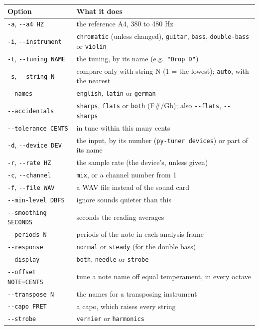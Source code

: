 \documentclass[12pt,
              article,
              oneside
              ]{memoir}
\begin{document}
\begin{longtable}{@{}lp{}@{}}
\toprule
Option & What it does\\
\midrule
\endhead
\texttt{-a}, \texttt{-{}-a4 HZ} & the reference A4, 380 to 480 Hz\\
\texttt{-i}, \texttt{-{}-instrument} & \texttt{chromatic} (unless changed), \texttt{guitar}, \texttt{bass}, \texttt{double-bass} or \texttt{violin}\\
\texttt{-t}, \texttt{-{}-tuning NAME} & the tuning, by its name (e.g.\ \texttt{"Drop D"})\\
\texttt{-s}, \texttt{-{}-string N} & compare only with string N (1 = the lowest); \texttt{auto}, with the nearest\\
\texttt{-{}-names} & \texttt{english}, \texttt{latin} or \texttt{german}\\
\texttt{-{}-accidentals} & \texttt{sharps}, \texttt{flats} or \texttt{both} (F\#/Gb); also \texttt{-{}-flats}, \texttt{-{}-sharps}\\
\texttt{-{}-tolerance CENTS} & in tune within this many cents\\
\texttt{-d}, \texttt{-{}-device DEV} & the input, by its number (\texttt{py-tuner devices}) or part of its name\\
\texttt{-r}, \texttt{-{}-rate HZ} & the sample rate (the device's, unless given)\\
\texttt{-c}, \texttt{-{}-channel} & \texttt{mix}, or a channel number from 1\\
\texttt{-f}, \texttt{-{}-file WAV} & a WAV file instead of the sound card\\
\texttt{-{}-min-level DBFS} & ignore sounds quieter than this\\
\texttt{-{}-smoothing SECONDS} & seconds the reading averages\\
\texttt{-{}-periods N} & periods of the note in each analysis frame\\
\texttt{-{}-response} & \texttt{normal} or \texttt{steady} (for the double bass)\\
\texttt{-{}-display} & \texttt{both}, \texttt{needle} or \texttt{strobe}\\
\texttt{-{}-offset NOTE=CENTS} & tune a note name off equal temperament, in every octave\\
\texttt{-{}-transpose N} & the names for a transposing instrument\\
\texttt{-{}-capo FRET} & a capo, which raises every string\\
\texttt{-{}-strobe} & \texttt{vernier} or \texttt{harmonics}\\

\end{longtable}
\end{document}

